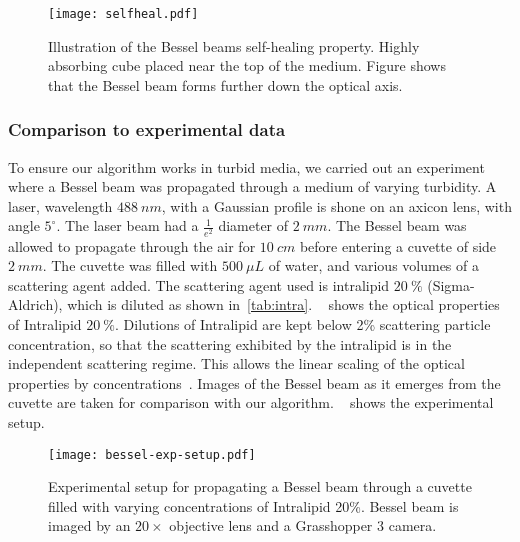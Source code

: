 \begin{figure}[!htbp]
\centering
\texttt{[image: selfheal.pdf]}
\caption{Illustration of the Bessel beams self-healing property. Highly absorbing cube placed near the top of the medium. Figure shows that the Bessel beam forms further down the optical axis.}
\label{fig:selfheal}
\end{figure}

\FloatBarrier

\subsubsection*{Comparison to experimental data}

To ensure our algorithm works in turbid media, we carried out an experiment where a Bessel beam was propagated through a medium of varying turbidity.
A laser, wavelength $488~nm$, with a Gaussian profile is shone on an axicon lens, with angle $5^{\circ}$.
The laser beam had a $\tfrac{1}{e^2}$ diameter of $2~mm$. 
The Bessel beam was allowed to propagate through the air for $10~cm$ before entering a cuvette of side $2~mm$.
The cuvette was filled with $500~\mu L$ of water, and various volumes of a scattering agent added.
The scattering agent used is intralipid $20~\%$ (Sigma-Aldrich), which is diluted as shown in~\cref{tab:intra}.
~ shows the optical properties of Intralipid $20~\%$.
Dilutions of Intralipid are kept below 2\% scattering particle concentration, so that the scattering exhibited by the intralipid is in the independent scattering regime.
This allows the linear scaling of the optical properties by concentrations~\cite{aernouts2013supercontinuum,vardaki2015studying,di2011effect}.
Images of the Bessel beam as it emerges from the cuvette are taken for comparison with our algorithm.
~ shows the experimental setup.

\begin{figure}[ht!]
    \centering
    \texttt{[image: bessel-exp-setup.pdf]}
    \caption{Experimental setup for propagating a Bessel beam through a cuvette filled with varying concentrations of Intralipid 20\%. Bessel beam is imaged by an $20\times$ objective lens and a Grasshopper 3 camera.}
    \label{fig:expsetup}
\end{figure}


